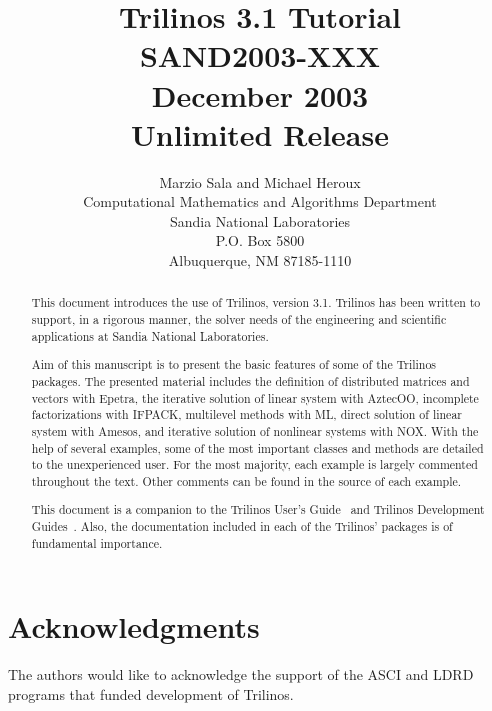 \documentclass[10pt,letter]{article}
\author{Marzio Sala and Michael Heroux \\
Computational Mathematics and Algorithms Department \\
Sandia National Laboratories \\
P.O. Box 5800 \\
Albuquerque, NM 87185-1110
}
\title{Trilinos 3.1 Tutorial \\
   SAND2003-XXX \\
December 2003 \\
Unlimited Release}
\newcommand{\Trilinos}{Trilinos}
\begin{document}
\maketitle

\begin{abstract}
  
  This document introduces the use of \Trilinos{}, version 3.1.
  \Trilinos{} has been written to support, in a rigorous manner, the
  solver needs of the engineering and scientific applications at Sandia
  National Laboratories.

  \medskip
  
  Aim of this manuscript is to present the basic features of some of the
  Trilinos packages. The presented material includes the definition of
  distributed matrices and vectors with Epetra, the iterative solution
  of linear system with AztecOO, incomplete factorizations with IFPACK,
  multilevel methods with ML, direct solution of linear system with
  Amesos, and iterative solution of nonlinear systems with NOX. With the
  help of several examples, some of the most important classes and
  methods are detailed to the unexperienced user.  For the most
  majority, each example is largely commented throughout the text. Other
  comments can be found in the source of each example.

  \medskip
  
  This document is a companion to the Trilinos User's
  Guide~\cite{Trilinos-Users-Guide} and Trilinos Development
  Guides~\cite{Trilinos-Dev-Guide,Trilinos-Dev-Guide-II}. Also, the
  documentation included in each of the Trilinos' packages is of
  fundamental importance.
 
\end{abstract}

\clearpage
\section*{Acknowledgments}
The authors would like to acknowledge the support of the ASCI and LDRD programs
that funded development of Trilinos.

\clearpage

\tableofcontents

\clearpage

























\end{document}
